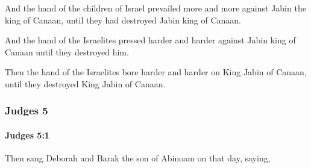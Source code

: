 			\begin{versebox}
					\item[BHS] 
					\item[ASV] And the hand of the children of Israel prevailed more and more against Jabin the king of Canaan, until they had destroyed Jabin king of Canaan.
					\item[NIV] And the hand of the Israelites pressed harder and harder against Jabin king of Canaan until they destroyed him.
					\item[NRSV] Then the hand of the Israelites bore harder and harder on King Jabin of Canaan, until they destroyed King Jabin of Canaan.
			\end{versebox}
	\subsubsection{Judges 5} %
		\label{JUDGES-5}

		\paragraph{Judges 5:1} %
			\label{JUDGES-5-1}

			Then sang Deborah and Barak the son of Abinoam on that day, saying,

